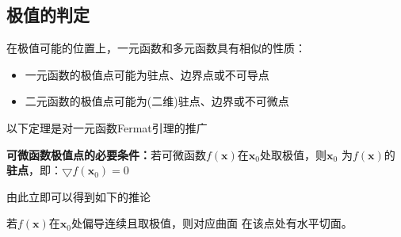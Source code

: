 \subsection{极值的判定}

在极值可能的位置上，一元函数和多元函数具有相似的性质：
\begin{itemize}
  \item 一元函数的极值点可能为{\kaishu 驻点、边界点或不可导点 }
  \item 二元函数的极值点可能为{\kaishu (二维)驻点、边界或不可微点} 
\end{itemize}

以下定理是对一元函数Fermat引理的推广
\begin{thx}
	{\bf 可微函数极值点的必要条件：}若可微函数$f(\bm{x})$在$\bm{x}_0$处取极值，则$\bm{x}_0$
	为$f(\bm{x})$的{\bf 驻点}，即：$\bigtriangledown f(\bm{x}_0)=0$
\end{thx}
由此立即可以得到如下的推论
\begin{thx}
	若$f(\bm{x})$在$\bm{x}_0$处偏导连续且取极值，则对应曲面
	在该点处有水平切面。
\end{thx}

